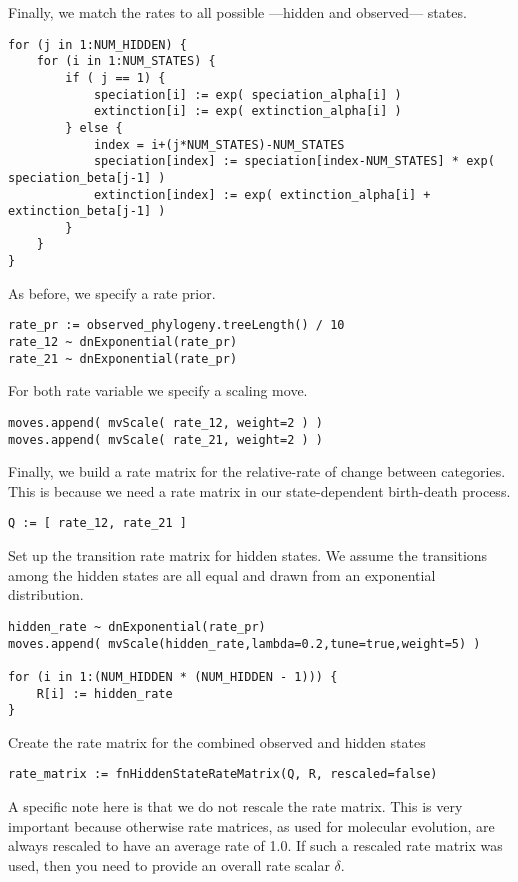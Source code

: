 Finally, we match the rates to all possible ---hidden and observed--- states.
{\tt \begin{snugshade*}
\begin{lstlisting}
for (j in 1:NUM_HIDDEN) {
    for (i in 1:NUM_STATES) {
        if ( j == 1) {
            speciation[i] := exp( speciation_alpha[i] )
            extinction[i] := exp( extinction_alpha[i] )
        } else {
            index = i+(j*NUM_STATES)-NUM_STATES
            speciation[index] := speciation[index-NUM_STATES] * exp( speciation_beta[j-1] )
            extinction[index] := exp( extinction_alpha[i] + extinction_beta[j-1] )
        }
    }
}
\end{lstlisting}
\end{snugshade*}}
As before, we specify a rate prior.
{\tt \begin{snugshade*}
\begin{lstlisting}
rate_pr := observed_phylogeny.treeLength() / 10
rate_12 ~ dnExponential(rate_pr)
rate_21 ~ dnExponential(rate_pr)
\end{lstlisting}
\end{snugshade*}}
For both rate variable we specify a scaling move.
{\tt \begin{snugshade*}
\begin{lstlisting}
moves.append( mvScale( rate_12, weight=2 ) )
moves.append( mvScale( rate_21, weight=2 ) )
\end{lstlisting}
\end{snugshade*}}
Finally, we build a rate matrix for the relative-rate of change between categories.
This is because we need a rate matrix in our state-dependent birth-death process.
{\tt \begin{snugshade*}
\begin{lstlisting}
Q := [ rate_12, rate_21 ]
\end{lstlisting}
\end{snugshade*}}
Set up the transition rate matrix for hidden states.
We assume the transitions among the hidden states are all equal and drawn from an exponential distribution.
{\tt \begin{snugshade*}
\begin{lstlisting}
hidden_rate ~ dnExponential(rate_pr)
moves.append( mvScale(hidden_rate,lambda=0.2,tune=true,weight=5) )

for (i in 1:(NUM_HIDDEN * (NUM_HIDDEN - 1))) {
    R[i] := hidden_rate
}
\end{lstlisting}
\end{snugshade*}}
Create the rate matrix for the combined observed and hidden states
{\tt \begin{snugshade*}
\begin{lstlisting}
rate_matrix := fnHiddenStateRateMatrix(Q, R, rescaled=false)
\end{lstlisting}
\end{snugshade*}}
A specific note here is that we do not rescale the rate matrix. 
This is very important because otherwise rate matrices, as used for molecular evolution, are always rescaled to have an average rate of 1.0.
If such a rescaled rate matrix was used, then you need to provide an overall rate scalar $\delta$.

